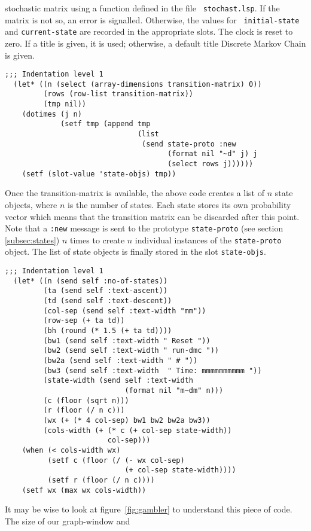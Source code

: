 stochastic matrix using a function defined in the file {\tt
  stochast.lsp}.  If the matrix is not so, an error is signalled.  
Otherwise, the values for {\tt
  initial-state} and {\tt current-state} are recorded in the
appropriate slots. The clock is reset to zero.  If a title is given,
it is used; otherwise, a default title {\sc Discrete Markov Chain} is
given. 
\begin{verbatim}
;;; Indentation level 1
  (let* ((n (select (array-dimensions transition-matrix) 0))
         (rows (row-list transition-matrix))
         (tmp nil))
    (dotimes (j n)
             (setf tmp (append tmp 
                               (list 
                                (send state-proto :new 
                                      (format nil "~d" j) j
                                      (select rows j))))))
    (setf (slot-value 'state-objs) tmp))
\end{verbatim}
Once the transition-matrix is available, the above code creates a list
of $n$ state objects, where $n$ is the number of states.  Each state
stores its own probability vector which means that the transition
matrix can be discarded after this point.  Note that a {\tt :new}
message is sent to the prototype {\tt state-proto} (see
section \ref{subsec:states}) $n$ times to create $n$ individual instances
of the {\tt state-proto} object.  The list of state objects is finally 
stored in the slot {\tt state-objs}. 
\begin{verbatim}
;;; Indentation level 1
  (let* ((n (send self :no-of-states))
         (ta (send self :text-ascent))
         (td (send self :text-descent))
         (col-sep (send self :text-width "mm"))
         (row-sep (+ ta td))
         (bh (round (* 1.5 (+ ta td))))
         (bw1 (send self :text-width " Reset "))
         (bw2 (send self :text-width " run-dmc "))
         (bw2a (send self :text-width " # "))
         (bw3 (send self :text-width  " Time: mmmmmmmmmm "))
         (state-width (send self :text-width 
                            (format nil "m~dm" n)))
         (c (floor (sqrt n)))
         (r (floor (/ n c)))
         (wx (+ (* 4 col-sep) bw1 bw2 bw2a bw3))
         (cols-width (+ (* c (+ col-sep state-width)) 
                        col-sep)))
    (when (< cols-width wx)
          (setf c (floor (/ (- wx col-sep) 
                            (+ col-sep state-width))))
          (setf r (floor (/ n c))))
    (setf wx (max wx cols-width))
\end{verbatim}
It may be wise to look at figure~\ref{fig:gambler} to 
understand this piece of code. The size of our graph-window and
